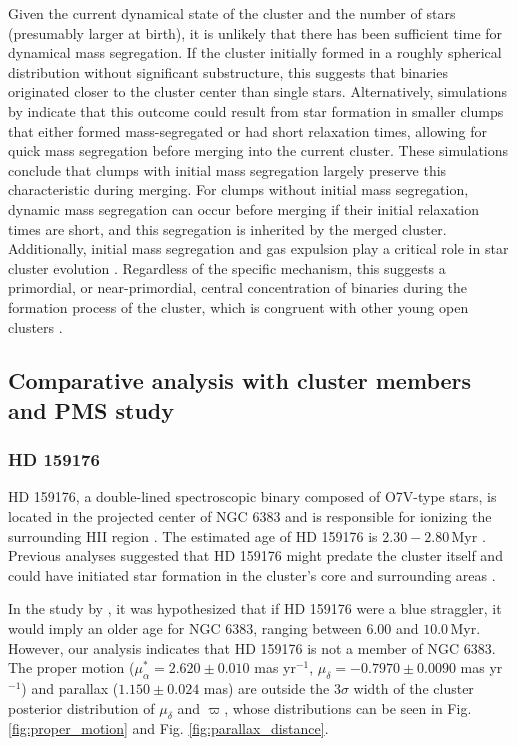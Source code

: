\documentclass{aa}
\begin{document}
Given the current dynamical state of the cluster and the number of stars (presumably larger at birth), it is unlikely that there has been sufficient time for dynamical mass segregation. If the cluster initially formed in a roughly spherical distribution without significant substructure, this suggests that binaries originated closer to the cluster center than single stars. Alternatively, simulations by \citet{2007ApJ...655L..45M} indicate that this outcome could result from star formation in smaller clumps that either formed mass-segregated or had short relaxation times, allowing for quick mass segregation before merging into the current cluster. These simulations conclude that clumps with initial mass segregation largely preserve this characteristic during merging. For clumps without initial mass segregation, dynamic mass segregation can occur before merging if their initial relaxation times are short, and this segregation is inherited by the merged cluster. Additionally, initial mass segregation and gas expulsion play a critical role in star cluster evolution \citep{2008MNRAS.386.2047M}. Regardless of the specific mechanism, this suggests a primordial, or near-primordial, central concentration of binaries during the formation process of the cluster, which is congruent with other young open clusters \citep{2007AJ....134.1368C,2007MNRAS.381L..40D,2008AJ....135..173S}.

\subsection{Comparative analysis with cluster members and PMS study}
\subsubsection{HD 159176}
HD 159176, a double-lined spectroscopic binary composed of O7V-type stars, is located in the projected center of NGC 6383 and is responsible for ionizing the surrounding HII region \citep{2016ApJ...832..211P}. The estimated age of HD 159176 is $2.30-2.80$\,Myr \citep{2010AA...511A..25R}. Previous analyses suggested that HD 159176 might predate the cluster itself and could have initiated star formation in the cluster's core and surrounding areas \citep{1978MNRAS.182..607F}.

In the study by \citet{2018AA...610A..30A}, it was hypothesized that if HD 159176 were a blue straggler, it would imply an older age for NGC 6383, ranging between $6.00$ and $10.0$\,Myr. However, our analysis indicates that HD 159176 is not a member of NGC 6383. The proper motion ($\mu_\alpha^* = 2.620 \pm 0.010$ mas yr$^{-1}$, $\mu_\delta = -0.7970 \pm 0.0090$ mas yr$^{-1}$) and parallax ($1.150 \pm 0.024$ mas) are outside the $3\sigma$ width of the cluster posterior distribution of $\mu_\delta$ and $\varpi$, whose distributions can be seen in Fig. \ref{fig:proper_motion} and Fig. \ref{fig:parallax_distance}.
\end{document}
